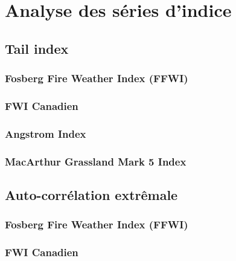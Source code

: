 \documentclass[
]{article}
\begin{document}
\hypertarget{analyse-des-suxe9ries-dindice}{%
\section{Analyse des séries
d'indice}\label{analyse-des-suxe9ries-dindice}}

\hypertarget{tail-index}{%
\subsection{Tail index}\label{tail-index}}

\hypertarget{fosberg-fire-weather-index-ffwi-2}{%
\subsubsection{Fosberg Fire Weather Index
(FFWI)}\label{fosberg-fire-weather-index-ffwi-2}}

\hypertarget{fwi-canadien-2}{%
\subsubsection{FWI Canadien}\label{fwi-canadien-2}}

\hypertarget{angstrom-index-2}{%
\subsubsection{Angstrom Index}\label{angstrom-index-2}}

\hypertarget{macarthur-grassland-mark-5-index-2}{%
\subsubsection{MacArthur Grassland Mark 5
Index}\label{macarthur-grassland-mark-5-index-2}}

\hypertarget{auto-corruxe9lation-extruxeamale}{%
\subsection{Auto-corrélation
extrêmale}\label{auto-corruxe9lation-extruxeamale}}

\hypertarget{fosberg-fire-weather-index-ffwi-3}{%
\subsubsection{Fosberg Fire Weather Index
(FFWI)}\label{fosberg-fire-weather-index-ffwi-3}}

\hypertarget{fwi-canadien-3}{%
\subsubsection{FWI Canadien}\label{fwi-canadien-3}}
\end{document}
